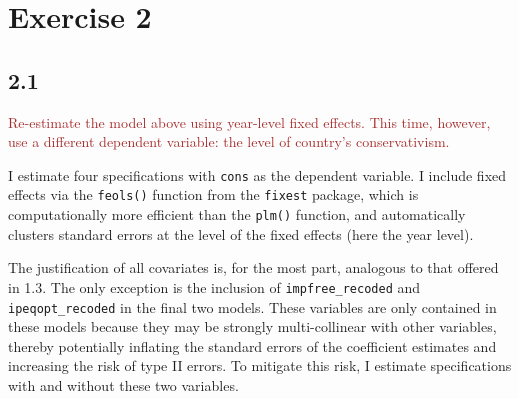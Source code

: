 \documentclass[
]{article}
\begin{document}
\hypertarget{exercise-2}{%
\section{Exercise 2}\label{exercise-2}}

\hypertarget{section-5}{%
\subsection{2.1}\label{section-5}}

\textcolor{brown}{Re-estimate the model above using year-level fixed effects. This time, however, use a different dependent variable: the level of country’s conservativism.}

I estimate four specifications with \texttt{cons} as the dependent
variable. I include fixed effects via the \texttt{feols()} function from
the \texttt{fixest} package, which is computationally more efficient
than the \texttt{plm()} function, and automatically clusters standard
errors at the level of the fixed effects (here the year level).

The justification of all covariates is, for the most part, analogous to
that offered in 1.3. The only exception is the inclusion of
\texttt{impfree\_recoded} and \texttt{ipeqopt\_recoded} in the final two
models. These variables are only contained in these models because they
may be strongly multi-collinear with other variables, thereby
potentially inflating the standard errors of the coefficient estimates
and increasing the risk of type II errors. To mitigate this risk, I
estimate specifications with and without these two variables.
\end{document}

